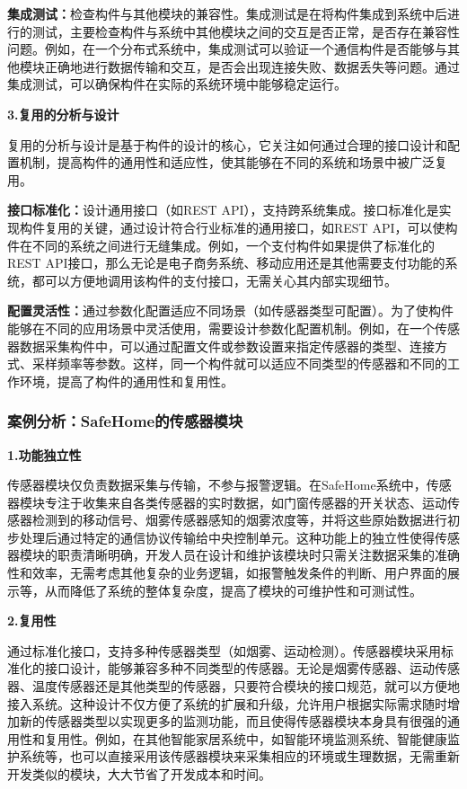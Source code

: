 \textbf{集成测试：}检查构件与其他模块的兼容性。集成测试是在将构件集成到系统中后进行的测试，主要检查构件与系统中其他模块之间的交互是否正常，是否存在兼容性问题。例如，在一个分布式系统中，集成测试可以验证一个通信构件是否能够与其他模块正确地进行数据传输和交互，是否会出现连接失败、数据丢失等问题。通过集成测试，可以确保构件在实际的系统环境中能够稳定运行。

\textbf{3.复用的分析与设计}

复用的分析与设计是基于构件的设计的核心，它关注如何通过合理的接口设计和配置机制，提高构件的通用性和适应性，使其能够在不同的系统和场景中被广泛复用。

\textbf{接口标准化：}设计通用接口（如REST API），支持跨系统集成。接口标准化是实现构件复用的关键，通过设计符合行业标准的通用接口，如REST API，可以使构件在不同的系统之间进行无缝集成。例如，一个支付构件如果提供了标准化的REST API接口，那么无论是电子商务系统、移动应用还是其他需要支付功能的系统，都可以方便地调用该构件的支付接口，无需关心其内部实现细节。

\textbf{配置灵活性：}通过参数化配置适应不同场景（如传感器类型可配置）。为了使构件能够在不同的应用场景中灵活使用，需要设计参数化配置机制。例如，在一个传感器数据采集构件中，可以通过配置文件或参数设置来指定传感器的类型、连接方式、采样频率等参数。这样，同一个构件就可以适应不同类型的传感器和不同的工作环境，提高了构件的通用性和复用性。

\subsubsection{案例分析：SafeHome的传感器模块}

\textbf{1.功能独立性}

传感器模块仅负责数据采集与传输，不参与报警逻辑。在SafeHome系统中，传感器模块专注于收集来自各类传感器的实时数据，如门窗传感器的开关状态、运动传感器检测到的移动信号、烟雾传感器感知的烟雾浓度等，并将这些原始数据进行初步处理后通过特定的通信协议传输给中央控制单元。这种功能上的独立性使得传感器模块的职责清晰明确，开发人员在设计和维护该模块时只需关注数据采集的准确性和效率，无需考虑其他复杂的业务逻辑，如报警触发条件的判断、用户界面的展示等，从而降低了系统的整体复杂度，提高了模块的可维护性和可测试性。

\textbf{2.复用性}

通过标准化接口，支持多种传感器类型（如烟雾、运动检测）。传感器模块采用标准化的接口设计，能够兼容多种不同类型的传感器。无论是烟雾传感器、运动传感器、温度传感器还是其他类型的传感器，只要符合模块的接口规范，就可以方便地接入系统。这种设计不仅方便了系统的扩展和升级，允许用户根据实际需求随时增加新的传感器类型以实现更多的监测功能，而且使得传感器模块本身具有很强的通用性和复用性。例如，在其他智能家居系统中，如智能环境监测系统、智能健康监护系统等，也可以直接采用该传感器模块来采集相应的环境或生理数据，无需重新开发类似的模块，大大节省了开发成本和时间。

